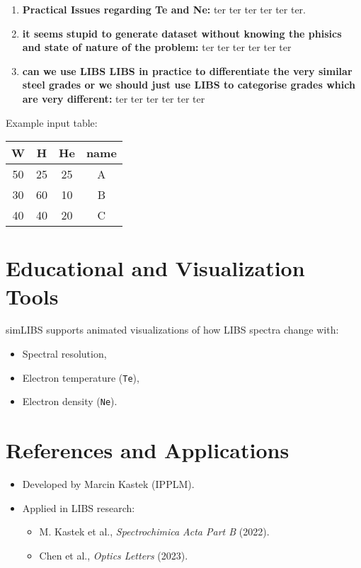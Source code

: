 \documentclass[12pt,a4paper]{article}
\begin{document}
\begin{enumerate}[label=\textbullet]
		\item \textbf{Practical Issues regarding Te and Ne:}  
		ter ter ter ter ter ter.
		
		\item \textbf{it seems stupid to generate dataset without knowing the phisics and state of nature of the problem:}  
		ter ter ter ter ter ter
		
		\item \textbf{can we use LIBS LIBS in practice to differentiate the very similar steel grades or we should just use LIBS to categorise grades which are very different:}  
		ter ter ter ter ter ter
		
		
	\end{enumerate}
	
	
	
	
	Example input table:
	
	\begin{center}
		\begin{tabular}{cccc}
			\toprule
			W & H & He & name \\
			\midrule
			50 & 25 & 25 & A \\
			30 & 60 & 10 & B \\
			40 & 40 & 20 & C \\
			\bottomrule
		\end{tabular}
	\end{center}
	
	\section{Educational and Visualization Tools}
	simLIBS supports animated visualizations of how LIBS spectra change with:
	\begin{itemize}
		\item Spectral resolution,
		\item Electron temperature (\texttt{Te}),
		\item Electron density (\texttt{Ne}).
	\end{itemize}
	
	\section{References and Applications}
	\begin{itemize}
		\item Developed by Marcin Kastek (IPPLM).
		\item Applied in LIBS research:
		\begin{itemize}
			\item M. Kastek et al., \textit{Spectrochimica Acta Part B} (2022).
			\item Chen et al., \textit{Optics Letters} (2023).
		\end{itemize}
	\end{itemize}
	
\end{document}
